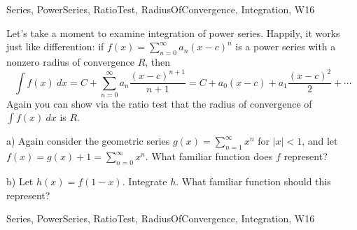  

\begin{tagblock}{Series, PowerSeries, RatioTest, RadiusOfConvergence, Integration, W16}
\begin{question}

Let's take a moment to examine integration of power series. Happily, it works just like differention: if $\displaystyle f(x)=\sum_{n=0}^{\infty} a_n(x-c)^n$ is a power series with a nonzero radius of convergence $R$, then 
\[
\int f(x) \ dx=C+\sum_{n=0}^{\infty}a_n\frac{(x-c)^{n+1}}{n+1}=C+a_0(x-c)+a_1\frac{(x-c)^2} 2+\cdots
\]
Again you can show via the ratio test that the radius of convergence of $\displaystyle\int f(x) \ dx$ is $R$. \bigskip

a) Again consider the geometric series $g(x)=\displaystyle\sum_{n=1}^{\infty}x^n$ for $|x|<1$, and let $f(x)=g(x)+1=\displaystyle\sum_{n=0}^{\infty}x^n$. What familiar function does $f$ represent?

\bigskip

b) Let $h(x)=f(1-x)$. Integrate $h$. What familiar function should this represent?
	
	
\begin{tags}
	    Series, PowerSeries, RatioTest, RadiusOfConvergence, Integration, W16
\end{tags}
	
\begin{diary}
	    
\end{diary}
	
\begin{solution}
	   
\end{solution}
	
\end{question}

\end{tagblock}

 

